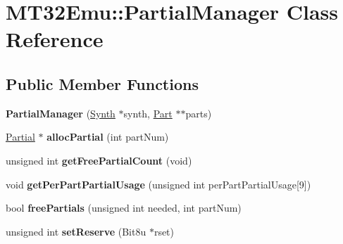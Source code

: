\hypertarget{classMT32Emu_1_1PartialManager}{\section{M\-T32\-Emu\-:\-:Partial\-Manager Class Reference}
\label{classMT32Emu_1_1PartialManager}
}
\subsection*{Public Member Functions}
\begin{DoxyCompactItemize}
\item 
\hypertarget{classMT32Emu_1_1PartialManager_a4d9b9066487e5c6fb1920f5cf5e12dbc}{{\bfseries Partial\-Manager} (\hyperlink{classMT32Emu_1_1Synth}{Synth} $\ast$synth, \hyperlink{classMT32Emu_1_1Part}{Part} $\ast$$\ast$parts)}\label{classMT32Emu_1_1PartialManager_a4d9b9066487e5c6fb1920f5cf5e12dbc}

\item 
\hypertarget{classMT32Emu_1_1PartialManager_a0b5eedfd5d38c462bb9da43984644b8a}{\hyperlink{classMT32Emu_1_1Partial}{Partial} $\ast$ {\bfseries alloc\-Partial} (int part\-Num)}\label{classMT32Emu_1_1PartialManager_a0b5eedfd5d38c462bb9da43984644b8a}

\item 
\hypertarget{classMT32Emu_1_1PartialManager_a0cc93f84577d59bf7a47456bfbf17863}{unsigned int {\bfseries get\-Free\-Partial\-Count} (void)}\label{classMT32Emu_1_1PartialManager_a0cc93f84577d59bf7a47456bfbf17863}

\item 
\hypertarget{classMT32Emu_1_1PartialManager_a0e91738af9fa8513ef30257755399ea1}{void {\bfseries get\-Per\-Part\-Partial\-Usage} (unsigned int per\-Part\-Partial\-Usage\mbox{[}9\mbox{]})}\label{classMT32Emu_1_1PartialManager_a0e91738af9fa8513ef30257755399ea1}

\item 
\hypertarget{classMT32Emu_1_1PartialManager_a7fa1cc60f54e1a23e6e8797d1d91ce8a}{bool {\bfseries free\-Partials} (unsigned int needed, int part\-Num)}\label{classMT32Emu_1_1PartialManager_a7fa1cc60f54e1a23e6e8797d1d91ce8a}

\item 
\hypertarget{classMT32Emu_1_1PartialManager_ae7ab34361f1734a467e9740dfe9dd9e3}{unsigned int {\bfseries set\-Reserve} (Bit8u $\ast$rset)}\label{classMT32Emu_1_1PartialManager_ae7ab34361f1734a467e9740dfe9dd9e3}


\end{DoxyCompactItemize}
